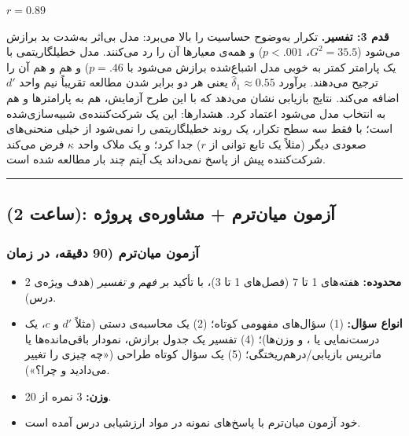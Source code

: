 \(r = 0.89\)

\textbf{قدم 3: تفسیر.} تکرار به‌وضوح حساسیت را بالا می‌برد: مدل بی‌اثر
به‌شدت بد برازش می‌شود (\(G^2 = 35.5\)، \(p < .001\)) و همه‌ی معیارها آن را
رد می‌کنند. مدل خطی\lr{--}لگاریتمی با یک پارامتر کمتر به خوبی مدل اشباع‌شده
برازش می‌شود  با \(p = .46\)) و هم  و هم  آن را
ترجیح می‌دهند. برآورد \(\hat\delta_1 \approx 0.55\) یعنی هر دو برابر شدن
مطالعه تقریباً نیم واحد \(d'\) اضافه می‌کند. نتایج بازیابی نشان می‌دهد که
با این طرح آزمایش، هم به پارامترها و هم به انتخاب مدل می‌شود اعتماد کرد.
هشدارها: این یک شرکت‌کننده‌ی شبیه‌سازی‌شده است؛ با فقط سه سطح تکرار، یک روند
خطی\lr{--}لگاریتمی را نمی‌شود از خیلی منحنی‌های صعودی دیگر (مثلاً یک تابع توانی
از \(r\)) جدا کرد؛ و یک ملاک واحد \(\kappa\) فرض می‌کند شرکت‌کننده پیش از
پاسخ نمی‌داند یک آیتم چند بار مطالعه شده است.

\begin{center}\rule{0.5\linewidth}{0.5pt}\end{center}


\subsection{\texorpdfstring{ (2 ساعت): آزمون میان‌ترم + مشاوره‌ی
پروژه}{lab (2 ساعت): آزمون میان‌ترم + مشاوره‌ی پروژه}}

\subsubsection{\texorpdfstring{آزمون میان‌ترم (90 دقیقه، در زمان
}{آزمون میان‌ترم (90 دقیقه، در زمان lab)}}

\begin{itemize}
\tightlist
\item
  \textbf{محدوده:} هفته‌های 1 تا 7 (فصل‌های 1 تا 3)، با تأکید بر \emph{فهم
  و تفسیر} (هدف ویژه‌ی 2 درس).
\item
  \textbf{انواع سؤال:} (1) سؤال‌های مفهومی کوتاه؛ (2) یک محاسبه‌ی دستی
  (مثلاً \(d'\) و \(c\)، یک درست‌نمایی یا ،  و وزن‌ها)؛
  (4) تفسیر یک جدول برازش، نمودار باقی‌مانده‌ها یا ماتریس
  بازیابی/درهم‌ریختگی؛ (5) یک سؤال کوتاه طراحی («چه چیزی را تغییر می‌دادید
  و چرا؟»).
\item
  \textbf{وزن:} 3 نمره از 20.
\item
  خود آزمون میان‌ترم با پاسخ‌های نمونه در مواد ارزشیابی درس آمده است.
\end{itemize}

